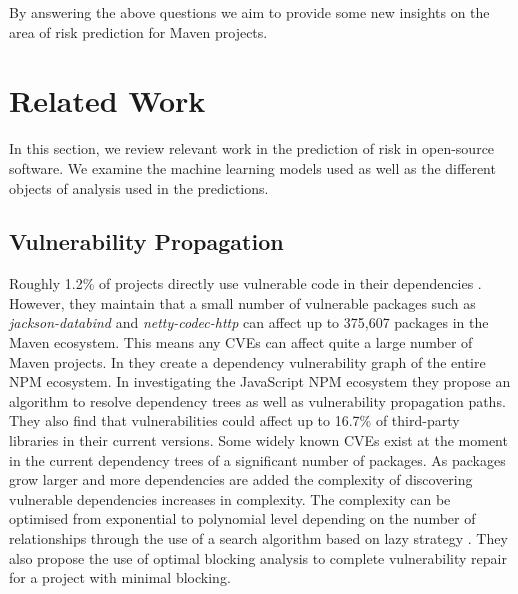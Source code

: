 \documentclass[conference]{IEEEtran}
\begin{document}
By answering the above questions we aim to provide some new insights on the area of risk prediction for Maven projects. 

\section{Related Work}
In this section, we review relevant work in the prediction of risk in open-source software. We examine the machine learning models used as well as the different objects of analysis used in the predictions.  

\subsection{Vulnerability Propagation}
Roughly 1.2\% of projects directly use vulnerable code in their dependencies \cite{a_m_mir_effect_2023}. However, they maintain that a small number of vulnerable packages such as \textit{jackson-databind} and \textit{netty-codec-http} can affect up to 375,607 packages in the Maven ecosystem. This means any CVEs can affect quite a large number of Maven projects. In \cite{c_liu_demystifying_2022} they create a dependency vulnerability graph of the entire NPM ecosystem. In investigating the JavaScript NPM ecosystem they propose an algorithm to resolve dependency trees as well as vulnerability propagation paths. They also find that vulnerabilities could affect up to 16.7\% of third-party libraries in their current versions. Some widely known CVEs exist at the moment in the current dependency trees of a significant number of packages. As packages grow larger and more dependencies are added the complexity of discovering vulnerable dependencies increases in complexity. The complexity can be optimised from exponential to polynomial level depending on the number of relationships through the use of a search algorithm based on lazy strategy \cite{w_hu_open_2019}. They also propose the use of optimal blocking analysis to complete vulnerability repair for a project with minimal blocking.
\end{document}
